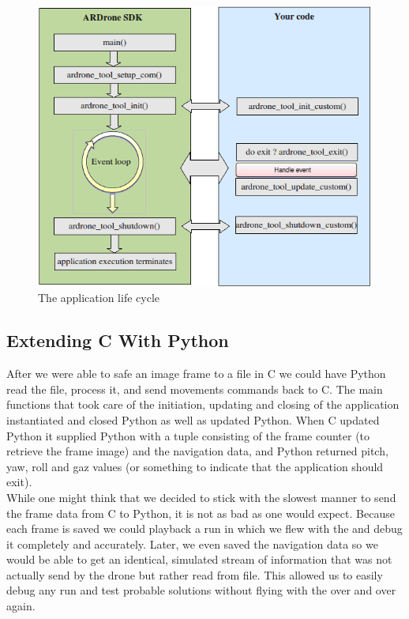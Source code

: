 \begin{figure}[h!]
  \centering
        \includegraphics[scale=0.5]{mainloop.png}
    \caption{The application life cycle}%
    \label{mainloop}
\end{figure}

\subsection{Extending C With Python}
After we were able to safe an image frame to a file in C we could have Python read the file, process it, and send movements commands back to C. The main functions 
that took care of the initiation, updating and closing of the application instantiated and closed Python as well as updated Python. When C updated Python it supplied
Python with a tuple consisting of the frame counter (to retrieve the frame image) and the navigation data, and Python returned pitch, yaw, roll and gaz values (or something
to indicate that the application should exit). \\

While one might think that we decided to stick with the slowest manner to send the frame data from C to Python, it is not as bad as one would expect. Because each frame is
saved we could playback a run in which we flew with the \Ardrone and debug it completely and accurately. Later, we even saved the navigation data so we would be able to 
get an identical, simulated stream of information that was not actually send by the drone but rather read from file. This allowed us to easily debug any run and test 
probable solutions without flying with the \Ardrone over and over again. \\

